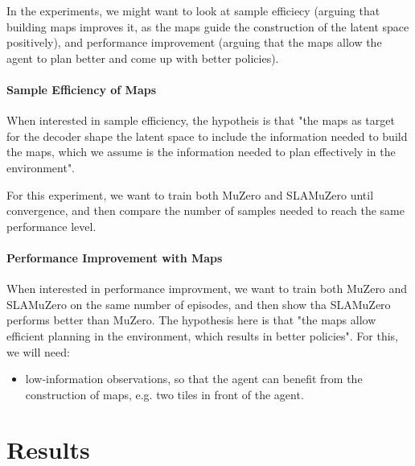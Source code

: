 \documentclass[12pt]{article}
\begin{document}
In the experiments, we might want to look at sample efficiecy (arguing that building maps improves it, as the maps guide the construction of the latent space positively), and performance improvement (arguing that the maps allow the agent to plan better and come up with better policies).

\paragraph{Sample Efficiency of Maps} 
When interested in sample efficiency, the hypotheis is that "the maps as target for the decoder shape the latent space to include the information needed to build the maps, which we assume is the information needed to plan effectively in the environment". 

For this experiment, we want to train both MuZero and SLAMuZero until convergence, and then compare the number of samples needed to reach the same performance level.

\paragraph{Performance Improvement with Maps}
When interested in performance improvment, we want to train both MuZero and SLAMuZero on the same number of episodes, and then show tha SLAMuZero performs better than MuZero. The hypothesis here is that "the maps allow efficient planning in the environment, which results in better policies". For this, we will need:
\begin{itemize}
    \item low-information observations, so that the agent can benefit from the construction of maps, e.g. two tiles in front of the agent.
\end{itemize}


\section{Results}

\printbibliography
\end{document}
